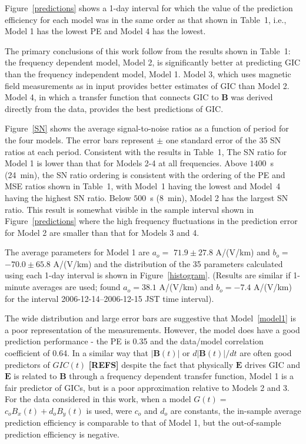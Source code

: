 \documentclass[draft,linenumbers]{agujournal2018}
\begin{document}
Figure~\ref{predictions} shows a 1-day interval for which the value of the prediction efficiency for each model was in the same order as that shown in Table~1, i.e., Model 1 has the lowest PE and Model 4 has the lowest.

The primary conclusions of this work follow from the results shown in Table~1: the frequency dependent model, Model 2, is significantly better at predicting GIC than the frequency independent model, Model 1. Model 3, which uses magnetic field measurements as in input provides better estimates of GIC than Model 2. Model 4, in which a transfer function that connects GIC to $\mathbf{B}$ was derived directly from the data, provides the best predictions of GIC. 

Figure~\ref{SN} shows the average signal-to-noise ratios as a function of period for the four models. The error bars represent $\pm$ one standard error of the 35 SN ratios at each period. Consistent with the results in Table~1, The SN ratio for Model 1 is lower than that for Models 2-4 at all frequencies.  Above $1400$~s (24~min), the SN ratio ordering is consistent with the ordering of the PE and MSE ratios shown in Table~1, with Model~1 having the lowest and Model~4 having the highest SN ratio. Below $500$~s (8~min), Model 2 has the largest SN ratio. This result is somewhat visible in the sample interval shown in Figure~\ref{predictions} where the high frequency fluctuations in the prediction error for Model 2 are smaller than that for Models 3 and 4.

The average parameters for Model 1 are $a_o = $ $71.9 \pm 27.8$ A/(V/km) and $b_o =$ $-70.0 \pm 65.8$ A/(V/km) and the distribution of the 35 parameters calculated using each 1-day interval is shown in Figure~\ref{histogram}. (Results are similar if 1-minute averages are used; \cite{Watari2015} found  $a_o=38.1$ A/(V/km) and $b_o=-7.4$ A/(V/km) for the interval 2006-12-14--2006-12-15 JST time interval).

The wide distribution and large error bars are suggestive that Model~\ref{model1} is a poor representation of the measurements. However, the model does have a good prediction performance - the PE is 0.35 and the data/model correlation coefficient of 0.64. In a similar way that $|\mathbf{B}(t)|$ or $d|\mathbf{B}(t)|/dt$ are often good predictors of $GIC(t)$   {\color{red} \textbf{[REFS]}} despite the fact that physically $\mathbf{E}$ drives GIC and $\mathbf{E}$ is related to $\mathbf{B}$ through a frequency dependent transfer function, Model 1 is a fair predictor of GICs, but is a poor approximation relative to Models 2 and 3. For the data considered in this work, when a model $G(t) = $ $c_oB_x(t) + d_oB_y(t)$ is used, were $c_o$ and $d_o$ are constants, the in-sample average prediction efficiency is comparable to that of Model 1, but the out-of-sample prediction efficiency is negative.
\end{document}
